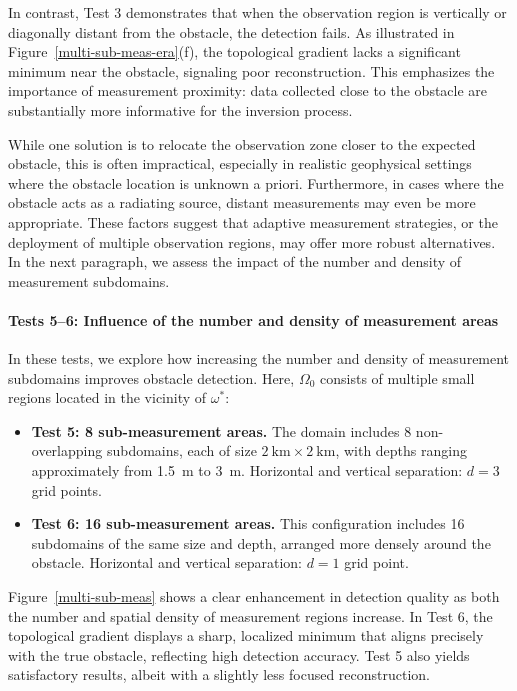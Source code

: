 \documentclass[a4paper,12pt,reqno,natbib]{amsart}
\begin{document}
In contrast, Test 3 demonstrates that when the observation region is vertically or diagonally distant from the obstacle, the detection fails. As illustrated in Figure~\ref{multi-sub-meas-era}(f), the topological gradient lacks a significant minimum near the obstacle, signaling poor reconstruction. This emphasizes the importance of measurement proximity: data collected close to the obstacle are substantially more informative for the inversion process.

While one solution is to relocate the observation zone closer to the expected obstacle, this is often impractical, especially in realistic geophysical settings where the obstacle location is unknown a priori. Furthermore, in cases where the obstacle acts as a radiating source, distant measurements may even be more appropriate. These factors suggest that adaptive measurement strategies, or the deployment of multiple observation regions, may offer more robust alternatives. In the next paragraph, we assess the impact of the number and density of measurement subdomains.

\vspace{0.3cm}
\paragraph{\textbf{Tests 5–6: Influence of the number and density of measurement areas}}  
In these tests, we explore how increasing the number and density of measurement subdomains improves obstacle detection. Here, \( \Omega_0 \) consists of multiple small regions located in the vicinity of \( \omega^* \):

\begin{itemize}
    \item \textbf{Test 5: 8 sub-measurement areas.}  
    The domain includes 8 non-overlapping subdomains, each of size \( 2~\text{km} \times 2~\text{km} \), with depths ranging approximately from 1.5~m to 3~m.  
    Horizontal and vertical separation: \( d = 3 \) grid points.

    \item \textbf{Test 6: 16 sub-measurement areas.}  
    This configuration includes 16 subdomains of the same size and depth, arranged more densely around the obstacle.  
    Horizontal and vertical separation: \( d = 1 \) grid point.
\end{itemize}

\noindent Figure~\ref{multi-sub-meas} shows a clear enhancement in detection quality as both the number and spatial density of measurement regions increase. In Test 6, the topological gradient displays a sharp, localized minimum that aligns precisely with the true obstacle, reflecting high detection accuracy. Test 5 also yields satisfactory results, albeit with a slightly less focused reconstruction.
\end{document}
